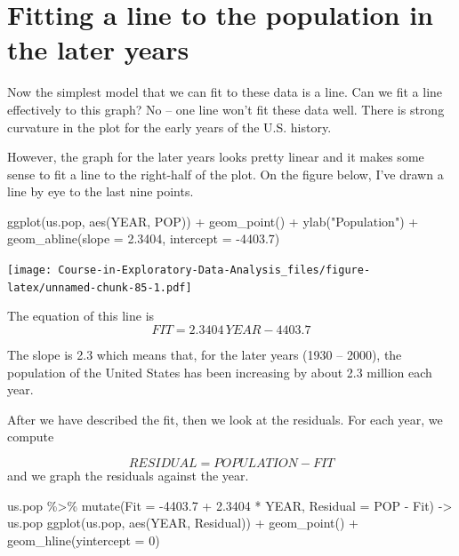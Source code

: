 \documentclass[
]{book}
\newenvironment{Shaded}{\begin{snugshade}}{\end{snugshade}}
\newcommand{\AttributeTok}[1]{\textcolor[rgb]{0.77,0.63,0.00}{#1}}
\newcommand{\DecValTok}[1]{\textcolor[rgb]{0.00,0.00,0.81}{#1}}
\newcommand{\FloatTok}[1]{\textcolor[rgb]{0.00,0.00,0.81}{#1}}
\newcommand{\FunctionTok}[1]{\textcolor[rgb]{0.00,0.00,0.00}{#1}}
\newcommand{\NormalTok}[1]{#1}
\newcommand{\OtherTok}[1]{\textcolor[rgb]{0.56,0.35,0.01}{#1}}
\newcommand{\SpecialCharTok}[1]{\textcolor[rgb]{0.00,0.00,0.00}{#1}}
\newcommand{\StringTok}[1]{\textcolor[rgb]{0.31,0.60,0.02}{#1}}
\begin{document}
\hypertarget{fitting-a-line-to-the-population-in-the-later-years}{%
\section{Fitting a line to the population in the later years}\label{fitting-a-line-to-the-population-in-the-later-years}}

Now the simplest model that we can fit to these data is a line. Can we fit a line effectively to this graph? No -- one line won't fit these data well. There is strong curvature in the plot for the early years of the U.S. history.

However, the graph for the later years looks pretty linear and it makes some sense to fit a line to the right-half of the plot. On the figure below, I've drawn a line by eye to the last nine points.

\begin{Shaded}
\begin{Highlighting}[]
\FunctionTok{ggplot}\NormalTok{(us.pop, }\FunctionTok{aes}\NormalTok{(YEAR, POP)) }\SpecialCharTok{+} 
  \FunctionTok{geom\_point}\NormalTok{() }\SpecialCharTok{+}
  \FunctionTok{ylab}\NormalTok{(}\StringTok{"Population"}\NormalTok{) }\SpecialCharTok{+}
  \FunctionTok{geom\_abline}\NormalTok{(}\AttributeTok{slope =} \FloatTok{2.3404}\NormalTok{, }\AttributeTok{intercept =} \SpecialCharTok{{-}}\FloatTok{4403.7}\NormalTok{)}
\end{Highlighting}
\end{Shaded}

\texttt{[image: Course-in-Exploratory-Data-Analysis\_files/figure-latex/unnamed-chunk-85-1.pdf]}

The equation of this line is
\[
FIT = 2.3404 \, YEAR - 4403.7
\]

The slope is 2.3 which means that, for the later years (1930 -- 2000), the population of the United States has been increasing by about 2.3 million each year.

After we have described the fit, then we look at the residuals. For each year, we compute

\[
RESIDUAL = POPULATION - FIT
\]
and we graph the residuals against the year.

\begin{Shaded}
\begin{Highlighting}[]
\NormalTok{us.pop }\SpecialCharTok{\%\textgreater{}\%} 
  \FunctionTok{mutate}\NormalTok{(}\AttributeTok{Fit =} \SpecialCharTok{{-}}\FloatTok{4403.7} \SpecialCharTok{+} \FloatTok{2.3404} \SpecialCharTok{*}\NormalTok{ YEAR,}
         \AttributeTok{Residual =}\NormalTok{ POP }\SpecialCharTok{{-}}\NormalTok{ Fit) }\OtherTok{{-}\textgreater{}}\NormalTok{ us.pop}
\FunctionTok{ggplot}\NormalTok{(us.pop, }\FunctionTok{aes}\NormalTok{(YEAR, Residual)) }\SpecialCharTok{+}
  \FunctionTok{geom\_point}\NormalTok{() }\SpecialCharTok{+}
  \FunctionTok{geom\_hline}\NormalTok{(}\AttributeTok{yintercept =} \DecValTok{0}\NormalTok{)}
\end{Highlighting}
\end{Shaded}
\end{document}
